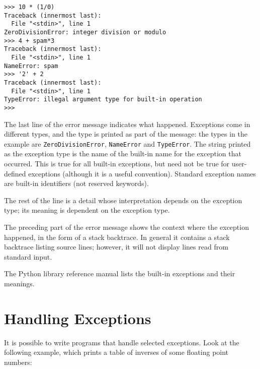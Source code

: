 \bcode\small\begin{verbatim}
>>> 10 * (1/0)
Traceback (innermost last):
  File "<stdin>", line 1
ZeroDivisionError: integer division or modulo
>>> 4 + spam*3
Traceback (innermost last):
  File "<stdin>", line 1
NameError: spam
>>> '2' + 2
Traceback (innermost last):
  File "<stdin>", line 1
TypeError: illegal argument type for built-in operation
>>> 
\end{verbatim}\ecode
%
The last line of the error message indicates what happened.
Exceptions come in different types, and the type is printed as part of
the message: the types in the example are
{\tt ZeroDivisionError},
{\tt NameError}
and
{\tt TypeError}.
The string printed as the exception type is the name of the built-in
name for the exception that occurred.  This is true for all built-in
exceptions, but need not be true for user-defined exceptions (although
it is a useful convention).
Standard exception names are built-in identifiers (not reserved
keywords).

The rest of the line is a detail whose interpretation depends on the
exception type; its meaning is dependent on the exception type.

The preceding part of the error message shows the context where the
exception happened, in the form of a stack backtrace.
In general it contains a stack backtrace listing source lines; however,
it will not display lines read from standard input.

The Python library reference manual lists the built-in exceptions and
their meanings.

\section{Handling Exceptions}

It is possible to write programs that handle selected exceptions.
Look at the following example, which prints a table of inverses of
some floating point numbers:

